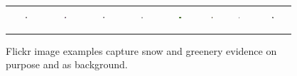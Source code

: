 \begin{figure}[t]
{\tiny{
\begin{center}
\begin{tabular}{@{}c@{\,\,\,}c@{\,\,\,}c@{\,\,\,}c@{\,\,\,}c@{\,\,\,}c@{\,\,\,}c@{\,\,\,}c@{\,\,\,}}
\includegraphics[width=0.05\textwidth, height=0.3in]{image/citysnow.jpg} &
\includegraphics[width=0.05\textwidth, height=0.3in]{image/citysnow2.jpg} &
\includegraphics[width=0.05\textwidth, height=0.3in]{image/dogsnow.jpg} &
\includegraphics[width=0.05\textwidth, height=0.3in]{image/humansnow.jpg} &
\includegraphics[width=0.05\textwidth, height=0.3in]{image/intentiongreen.jpg} &
\includegraphics[width=0.05\textwidth, height=0.3in]{image/waterfallgreen.jpg} &
\includegraphics[width=0.05\textwidth, height=0.3in]{image/dogtree.jpg} &
\includegraphics[width=0.05\textwidth, height=0.3in]{image/humantree.jpg} \\
\end{tabular}
\end{center}
}}
\vspace{-18pt}
\caption{Flickr image examples capture snow and greenery evidence on purpose and as background.}
\label{fig:flickrexp}
\vspace{-12pt}
\end{figure}


